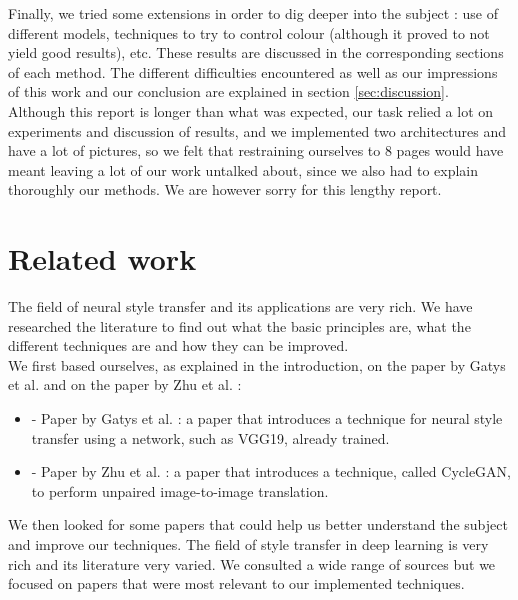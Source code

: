 \documentclass[twocolumn,superscriptaddress,aps,floatfix,nofootinbib]{revtex4-1}
\begin{document}
    Finally, we tried some extensions in order to dig deeper into the subject : use of different models, techniques to try to control colour (although it proved to not yield good results), etc. These results are discussed in the corresponding sections of each method. The different difficulties encountered as well as our impressions of this work and our conclusion are explained in section \ref{sec:discussion}.\\
    
    Although this report is longer than what was expected, our task relied a lot on experiments and discussion of results, and we implemented two architectures and have a lot of pictures, so we felt that restraining ourselves to 8 pages would have meant leaving a lot of our work untalked about, since we also had to explain thoroughly our methods. We are however sorry for this lengthy report.
    
    
    
    
    \section{Related work}
    
    The field of neural style transfer and its applications are very rich. We have researched the literature to find out what the basic principles are, what the different techniques are and how they can be improved.\\
    
    We first based ourselves, as explained in the introduction, on the paper by Gatys et al. and on the paper by Zhu et al. :
    
    \begin{itemize}
        \item \cite{DBLP:journals/corr/GatysEB15a} - Paper by Gatys et al. : a paper that introduces a technique for neural style transfer using a network, such as VGG19, already trained.
        \item \cite{DBLP:journals/corr/ZhuPIE17} - Paper by Zhu et al. : a paper that introduces a technique, called CycleGAN, to perform unpaired image-to-image translation.
    \end{itemize}
    
    We then looked for some papers that could help us better understand the subject and improve our techniques. The field of style transfer in deep learning is very rich and its literature very varied. We consulted a wide range of sources but we focused on papers that were most relevant to our implemented techniques.
    
\end{document}
